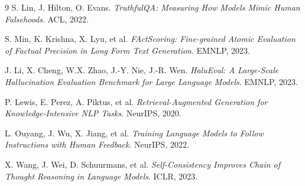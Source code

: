 \documentclass[11pt,a4paper]{article}
\begin{document}
\begin{thebibliography}{9}
S. Lin, J. Hilton, O. Evans.
\textit{TruthfulQA: Measuring How Models Mimic Human Falsehoods}.
ACL, 2022.

S. Min, K. Krishna, X. Lyu, et al.
\textit{FActScoring: Fine-grained Atomic Evaluation of Factual Precision in Long Form
Text Generation}. EMNLP, 2023.

J. Li, X. Cheng, W.X. Zhao, J.-Y. Nie, J.-R. Wen.
\textit{HaluEval: A Large-Scale Hallucination Evaluation Benchmark for Large Language
Models}. EMNLP, 2023.

P. Lewis, E. Perez, A. Piktus, et al.
\textit{Retrieval-Augmented Generation for Knowledge-Intensive NLP Tasks}.
NeurIPS, 2020.

L. Ouyang, J. Wu, X. Jiang, et al.
\textit{Training Language Models to Follow Instructions with Human Feedback}.
NeurIPS, 2022.

X. Wang, J. Wei, D. Schuurmans, et al.
\textit{Self-Consistency Improves Chain of Thought Reasoning in Language Models}.
ICLR, 2023.
\end{thebibliography}
\end{document}
